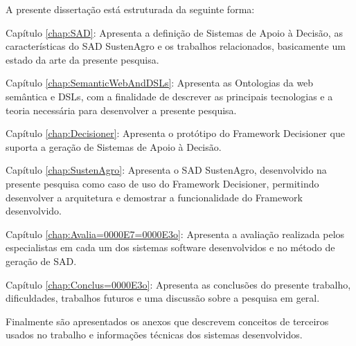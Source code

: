 A presente dissertação está estruturada da seguinte forma:

Capítulo \ref{chap:SAD}: Apresenta a definição de Sistemas de Apoio
à Decisão, as características do SAD SustenAgro e os trabalhos relacionados,
basicamente um estado da arte da presente pesquisa.

Capítulo \ref{chap:SemanticWebAndDSLs}: Apresenta as Ontologias da
web semântica e \foreignlanguage{english}{DSLs}, com a finalidade
de descrever as principais tecnologias e a teoria necessária para
desenvolver a presente pesquisa.

Capítulo \ref{chap:Decisioner}: Apresenta o protótipo do Framework
Decisioner que suporta a geração de Sistemas de Apoio à Decisão. 

Capítulo \ref{chap:SustenAgro}: Apresenta o SAD SustenAgro, desenvolvido
na presente pesquisa como caso de uso do Framework Decisioner, permitindo
desenvolver a arquitetura e demostrar a funcionalidade do Framework
desenvolvido.

Capítulo \ref{chap:Avalia=0000E7=0000E3o}: Apresenta a avaliação
realizada pelos especialistas em cada um dos sistemas software desenvolvidos
e no método de geração de SAD.

Capítulo \ref{chap:Conclus=0000E3o}: Apresenta as conclusões do presente
trabalho, dificuldades, trabalhos futuros e uma discussão sobre a
pesquisa em geral.

Finalmente são apresentados os anexos que descrevem conceitos de terceiros
usados no trabalho e informações técnicas dos sistemas desenvolvidos.
